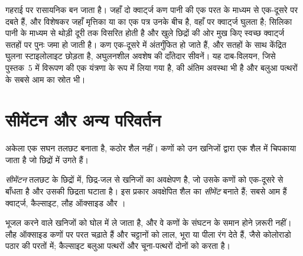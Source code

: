 गहराई पर  रासायनिक बन जाता है। जहाँ दो क्वार्ट्ज कण पानी की एक परत के माध्यम से एक-दूसरे पर दबते हैं, और विशेषकर जहाँ मृत्तिका या  का एक पत्र उनके बीच है, वहाँ  पर क्वार्ट्ज घुलता है; सिलिका पानी के माध्यम से थोड़ी दूरी तक विसरित होती है और खुले छिद्रों की ओर मुख किए स्वच्छ क्वार्ट्ज सतहों पर पुनः जमा हो जाती है। कण एक-दूसरे में अंतर्गुंफित हो जाते हैं, और सतहों के साथ केंद्रित घुलना स्टाइलोलाइट छोड़ता है, अघुलनशील अवशेष की दाँतेदार सीवनें। यह दाब-विलयन, जिसे पुस्तक~5 में विरूपण की एक यंत्रणा के रूप में लिया गया है,  की अंतिम अवस्था भी है और बलुआ पत्थरों के सबसे आम  का स्रोत भी।

\section{सीमेंटन और अन्य परिवर्तन}\label{sec:b1:diagenesis-basins:cementation}

 अकेला एक सघन तलछट बनाता है, कठोर शैल नहीं। कणों को उन खनिजों द्वारा एक शैल में चिपकाया जाता है जो छिद्रों में उगते हैं।

\begin{definition}[सीमेंटन, सीमेंट]\label{def:b1:diagenesis-basins:cement}
\emph{सीमेंटन} तलछट के छिद्रों में, छिद्र-जल से खनिजों का अवक्षेपण है, जो उसके कणों को एक-दूसरे से बाँधता है और उसकी छिद्रता घटाता है। इस प्रकार अवक्षेपित  शैल का \emph{सीमेंट} बनाते हैं; सबसे आम हैं क्वार्ट्ज, कैल्साइट, लौह ऑक्साइड और ।
\end{definition}

भूजल  करने वाले खनिजों को घोल में ले जाता है, और वे कणों के संघटन के समान होने ज़रूरी नहीं। लौह ऑक्साइड कणों पर परत चढ़ाते हैं और चट्टानों को लाल, भूरा या पीला रंग देते हैं, जैसे कोलोराडो पठार की परतों में; कैल्साइट बलुआ पत्थरों और चूना-पत्थरों दोनों को  करता है।

